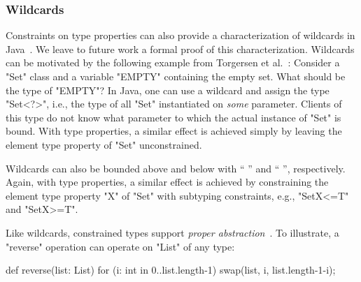 \subsubsection{Wildcards}
\label{sec:wildcards}

Constraints on type properties can also provide a characterization of
wildcards in Java~\cite{Java3,adding-wildcards,wildcards-safe}.
We leave to future work a formal proof of this
characterization.
Wildcards can be  motivated
by the following example from Torgersen et al.~\cite{adding-wildcards}:
Consider a \xcd"Set" class and a variable \xcd"EMPTY" containing
the empty set.  What should be the type of \xcd"EMPTY"?
In Java, one can use a wildcard and 
assign the type \xcd"Set<?>", i.e., the type of all \xcd"Set"
instantiated on \emph{some} parameter.  Clients of this
type do not know what parameter to which the actual instance of \xcd"Set"
is bound.
With type properties,
a similar effect is achieved simply by leaving the
element type property of \xcd"Set" unconstrained.

Wildcards can
also be bounded above and below with
``  '' and ``  '',
respectively.
%
Again, with type properties, 
a similar effect is achieved by constraining
the
element type property \xcd"X" of \xcd"Set" with subtyping constraints,
e.g., \xcd"Set{X<=T}" and \xcd"Set{X>=T}".


Like wildcards,
constrained types support
\emph{proper abstraction}~\cite{adding-wildcards}.  To illustrate, a
\xcd"reverse"
operation can operate on \xcd"List" of any type:
{
\begin{xten}
def reverse(list: List) {
  for (i: int in 0..list.length-1)
    swap(list, i, list.length-1-i);
}
\end{xten}}

